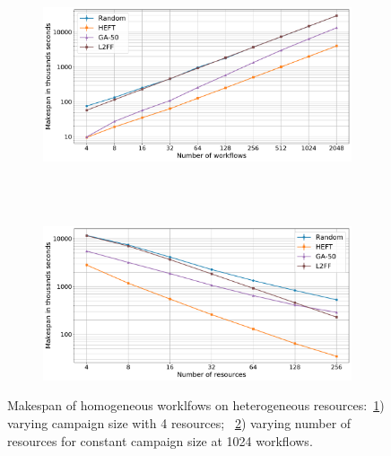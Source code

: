 \begin{figure}[ht!]
    \centering
    \begin{subfigure}[b]{0.75\textwidth}
        \includegraphics[width=.95\textwidth]{figures/campaign/StHomoCampaigns_4StHeteroResources.pdf}
        \caption{}
        \label{fig:StHomoCampaigns_4StHeteroResources}
    \end{subfigure}\\
    ~ 
    \begin{subfigure}[b]{0.75\textwidth}
        \includegraphics[width=.95\textwidth]{figures/campaign/StHeteroResources_StHomoCampaigns.pdf}
        \caption{}
        \label{fig:HeteroResources_StHomoCampaigns}
    \end{subfigure}
    \caption{Makespan of homogeneous worklfows on heterogeneous resources:~\ref{fig:StHomoCampaigns_4StHeteroResources}) varying campaign size with 4 resources;
        ~\ref{fig:HeteroResources_StHomoCampaigns}) varying number of resources for constant campaign size at 1024 workflows.}
    \label{fig:hom_het_analysis}
\end{figure}

